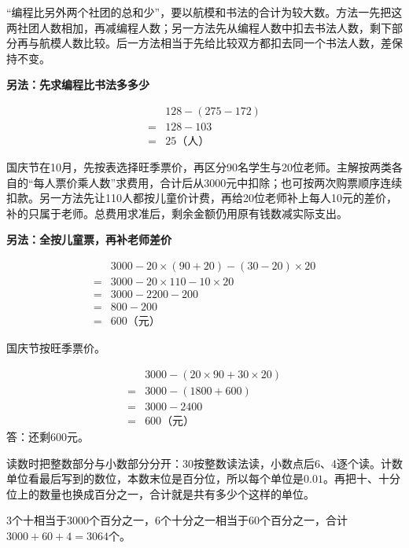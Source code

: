 \documentclass[multi=snippet,border=0pt]{standalone}
\newenvironment{snippet}[3]{\begin{minipage}{#1bp}\color{answerred}\fontsize{#2}{#3}\selectfont\raggedright}{\end{minipage}}
\begin{document}
\begin{snippet}{505}{11.5}{14}“编程比另外两个社团的总和少”，要以航模和书法的合计为较大数。方法一先把这两社团人数相加，再减编程人数；另一方法先从编程人数中扣去书法人数，剩下部分再与航模人数比较。后一方法相当于先给比较双方都扣去同一个书法人数，差保持不变。\par \textbf{另法：先求编程比书法多多少}\par \[\begin{aligned}&128-(275-172)\\={}&128-103\\={}&25\text{（人）}\end{aligned}\]\end{snippet}
\begin{snippet}{505}{11.5}{14}国庆节在10月，先按表选择旺季票价，再区分90名学生与20位老师。主解按两类各自的“每人票价乘人数”求费用，合计后从3000元中扣除；也可按两次购票顺序连续扣款。另一方法先让110人都按儿童价计费，再给20位老师补上每人10元的差价，补的只属于老师。总费用求准后，剩余金额仍用原有钱数减实际支出。\par \textbf{另法：全按儿童票，再补老师差价}\par \[\begin{aligned}&3000-20\times(90+20)-(30-20)\times20\\={}&3000-20\times110-10\times20\\={}&3000-2200-200\\={}&800-200\\={}&600\text{（元）}\end{aligned}\]\end{snippet}
\begin{snippet}{264}{10.5}{12.8}国庆节按旺季票价。\par \[\begin{aligned}&3000-(20\times90+30\times20)\\={}&3000-(1800+600)\\={}&3000-2400\\={}&600\text{（元）}\end{aligned}\]答：还剩600元。\end{snippet}
\begin{snippet}{505}{11.5}{14}读数时把整数部分与小数部分分开：30按整数读法读，小数点后6、4逐个读。计数单位看最后写到的数位，本数末位是百分位，所以每个单位是\(0.01\)。再把十、十分位上的数量也换成百分之一，合计就是共有多少个这样的单位。\par 3个十相当于3000个百分之一，6个十分之一相当于60个百分之一，合计\(3000+60+4=3064\)个。\end{snippet}
\end{document}
